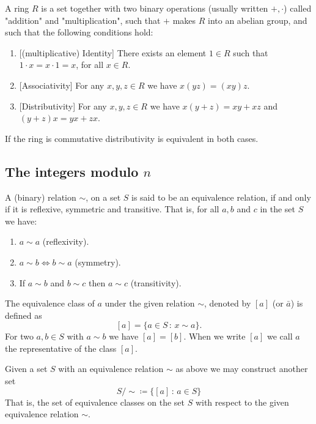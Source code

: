 \documentclass[10pt, a4paper]{article}
\begin{document}
\begin{definition}[Ring]
    A ring $R$ is a set together with two binary operations
    (usually written $+, \cdot$)
    called "addition" and "multiplication",
    such that $+$ makes $R$ into an abelian group,
    and such that the following conditions hold:
    
    \begin{enumerate}[label = \roman*)]
        \item \phantom{}[(multiplicative) Identity]
        There exists an element $1 \in R$ such that $1 \cdot x = x \cdot 1 = x$,
        for all $x \in R$.

        \item \phantom{}[Associativity]
        For any $x, y, z \in R$ we have $x(yz) = (xy)z$.

        \item \phantom{}[Distributivity]
        For any $x, y, z \in R$ we have $x(y + z) = xy + xz$ and $(y + z)x = yx + zx$.
    \end{enumerate}
\end{definition}

If the ring is commutative distributivity is equivalent in both cases.

\subsection{The integers modulo \texorpdfstring{$n$}{}}
A
(binary)
relation $\sim$,
on a set $S$ is said to be an equivalence relation,
if and only if it is reflexive,
symmetric and transitive.
That is,
for all $a, b$ and $c$ in the set $S$ we have:
\begin{enumerate}[label = \roman*)]
    \item 
    $a \sim a$
    (reflexivity).

    \item
    $a \sim b \iff b \sim a$
    (symmetry).

    \item
    If $a \sim b$ and $b \sim c$ then $a \sim c$
    (transitivity).
\end{enumerate}

The equivalence class of $a$ under the given relation $\sim$,
denoted by $[a]$
(or $\bar{a}$)
is defined as
\[
[a] = \{a \in S\,:\, x \sim a\}.
\]
For two $a, b \in S$ with $a \sim b$ we have $[a] = [b]$.
When we write $[a]$ we call $a$ the representative of the class $[a]$.

Given a set $S$ with an equivalence relation $\sim$ as above we may construct another set
\[
S / \sim \coloneqq \{[a]\, :\, a \in S\}
\]
That is,
the set of equivalence classes on the set $S$ with respect to the given equivalence relation $\sim$.
\end{document}
